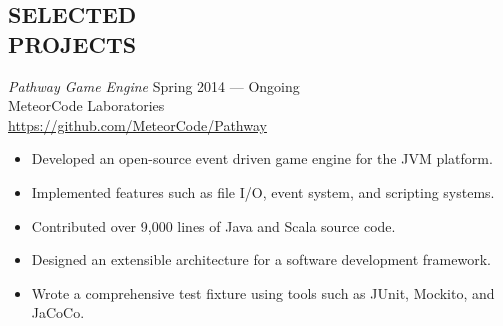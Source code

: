 \documentclass[margin]{res}
\begin{document}
\begin{resume}

\section{SELECTED \\ PROJECTS}
		{\sl Pathway Game Engine} \hfill Spring 2014 --- Ongoing \\
        		MeteorCode Laboratories \\ 
		\url{https://github.com/MeteorCode/Pathway}
		\begin{itemize} \itemsep -2pt %
		\item Developed an open-source event driven game engine for the JVM platform.
		\item Implemented features such as file I/O, event system, and scripting systems.
		\item Contributed over 9,000 lines of Java and Scala source code.
		\item Designed an extensible architecture for a software development framework.
		\item Wrote a comprehensive test fixture using tools such as JUnit, Mockito, and JaCoCo.
		\end{itemize}
		

\end{resume}
\end{document}
